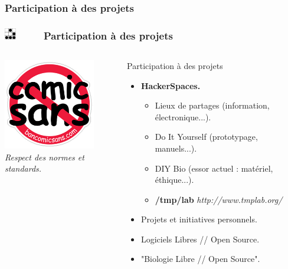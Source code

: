 \documentclass[slidetop,11pt]{beamer}
\def\sectionPartIIIbDE{Participation {\`a} des projets}
\def\moreInFrameTitle{\includegraphics[height=0.5cm]{img/logo_glider.png}~~~~~}
\begin{document}
\subsubsection{\sectionPartIIIbDE}
\begin{frame}
	\frametitle{\moreInFrameTitle \sectionPartIIIbDE}
	\begin{columns}[c]
	\begin{column}[c]{5cm}
		\includegraphics[width=4cm]{img/nocomicsans.png}~\\
		{\footnotesize \emph{Respect des normes et standards. } }~\\
	\end{column}
	\begin{column}[c]{7cm}
		 \begin{beamerboxesrounded}	[lower=substructureDE, %
		 				 upper=block title DE,%
						 shadow=true]%
		       {\sectionPartIIIbDE}
			\begin{itemize}
				\item<2-> \textbf<2-3>{HackerSpaces. }
				\begin{itemize}
					\item Lieux de partages (information, {\'e}lectronique...). 
					\item Do It Yourself (prototypage, manuels...). 
					\item DIY Bio (essor actuel : mat{\'e}riel, {\'e}thique...). 
					\item \textbf{/tmp/lab} \emph{http://www.tmplab.org/}
				\end{itemize}
				\item<3-> Projets et initiatives personnels. 
				\item<4-> Logiciels Libres // Open Source. 
				\item<4-> "Biologie Libre // Open Source". 
			\end{itemize}
		\end{beamerboxesrounded}
	\end{column}
	\end{columns}
\end{frame} 
\end{document}
